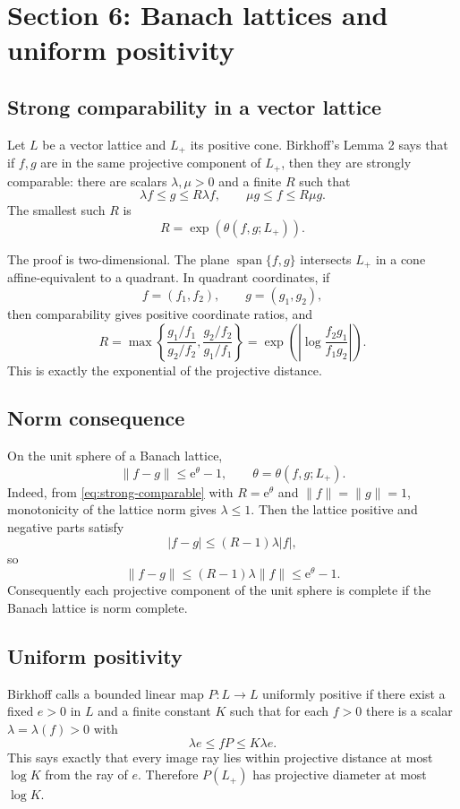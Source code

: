 \documentclass[11pt]{article}
\newcommand{\e}{\mathrm{e}}
\newcommand{\spanop}{\operatorname{span}}
\begin{document}
\section{Section 6: Banach lattices and uniform positivity}

\subsection{Strong comparability in a vector lattice}
Let \(L\) be a vector lattice and \(L_+\) its positive cone.  Birkhoff's Lemma 2 says that if \(f,g\) are in the same projective component of \(L_+\), then they are strongly comparable: there are scalars \(\lambda,\mu>0\) and a finite \(R\) such that
\begin{equation}
  \lambda f\le g\le R\lambda f,
  \qquad
  \mu g\le f\le R\mu g.
  \label{eq:strong-comparable}
\end{equation}
The smallest such \(R\) is
\[
  R=\exp(\theta(f,g;L_+)).
\]

The proof is two-dimensional.  The plane \(\spanop\{f,g\}\) intersects \(L_+\) in a cone affine-equivalent to a quadrant.  In quadrant coordinates, if
\[
  f=(f_1,f_2),\qquad g=(g_1,g_2),
\]
then comparability gives positive coordinate ratios, and
\[
  R=\max\left\{\frac{g_1/f_1}{g_2/f_2},\frac{g_2/f_2}{g_1/f_1}\right\}
  =\exp\left(\left|\log\frac{f_2g_1}{f_1g_2}\right|\right).
\]
This is exactly the exponential of the projective distance.

\subsection{Norm consequence}
On the unit sphere of a Banach lattice,
\begin{equation}
  \|f-g\|\le \e^\theta-1,
  \qquad \theta=\theta(f,g;L_+).
  \label{eq:norm-projective-control}
\end{equation}
Indeed, from \eqref{eq:strong-comparable} with \(R=\e^\theta\) and \(\|f\|=\|g\|=1\), monotonicity of the lattice norm gives \(\lambda\le1\).  Then the lattice positive and negative parts satisfy
\[
  |f-g|\le (R-1)\lambda |f|,
\]
so
\[
  \|f-g\|\le (R-1)\lambda\|f\|
  \le \e^\theta-1.
\]
Consequently each projective component of the unit sphere is complete if the Banach lattice is norm complete.

\subsection{Uniform positivity}
Birkhoff calls a bounded linear map \(P:L\to L\) uniformly positive if there exist a fixed \(e>0\) in \(L\) and a finite constant \(K\) such that for each \(f>0\) there is a scalar \(\lambda=\lambda(f)>0\) with
\begin{equation}
  \lambda e\le fP\le K\lambda e.
  \label{eq:uniform-positive}
\end{equation}
This says exactly that every image ray lies within projective distance at most \(\log K\) from the ray of \(e\).  Therefore \(P(L_+)\) has projective diameter at most \(\log K\).
\end{document}
